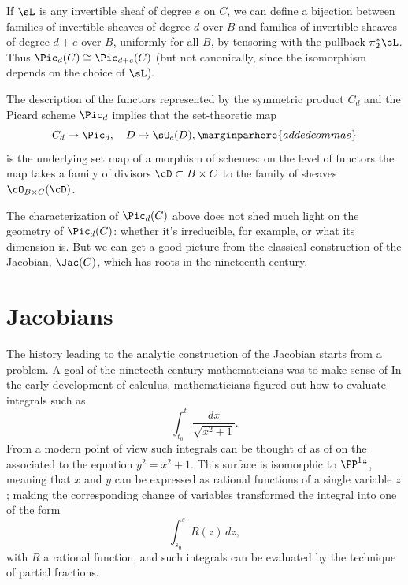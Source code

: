 If $\sL$ is any invertible sheaf of degree $e$ on $C$, we can define a
bijection between families of invertible sheaves of degree $d$ over
%
$B$ and families of invertible sheaves of degree $d+e$ over $B$,
uniformly for all $B$, by tensoring with the pullback $\pi_2^*\sL$.
Thus $\Pic_d(C) \cong \Pic_{d+e}(C)$ (but not canonically, since the
isomorphism depends on the choice of $\sL$).
 
The description of the functors represented by the symmetric product $C_d$ and the Picard scheme $\Pic_d$ implies that the 
set-theoretic map
$$
C_d \to \Pic_d, \quad D \mapsto \sO_c(D),
\marginparhere{added commas}
$$
is the underlying set map of a morphism of schemes: on the level of functors the map takes a family of divisors $\cD\subset B\times C$
to the family of sheaves $\cO_{B\times C}(\cD)$.

The characterization of $\Pic_d(C)$ 
above does not shed much light on the geometry of $\Pic_d(C)$: whether
it's irreducible, for example, or what its dimension is. But we can
get a  good picture from the classical construction of the Jacobian,
$\Jac(C)$, which has roots in the nineteenth century.
 
\section{Jacobians}

The history leading to the analytic construction of the Jacobian
%
starts from a 
%
%
%
problem. A goal of the nineteeth century
mathematicians was  to make sense of 
%
In the early development of calculus, mathematicians figured out how
to evaluate integrals such as
$$
\int_{t_0}^t \frac{dx}{\sqrt{x^2+1}}.
$$
From a modern point of view such integrals can be thought of as 
%
of 
%
on the 
%
associated to the equation $y^2 = x^2+1$. This surface is isomorphic
to $\PP^1` `$, meaning that $x$ and $y$ can be expressed as rational
functions of a single variable $z$; making the corresponding change of
variables transformed the integral into one of the form 
$$
\int_{s_0}^s R(z)\,dz,
$$
with $R$ a rational function, and such integrals can be evaluated by the technique of partial fractions.

